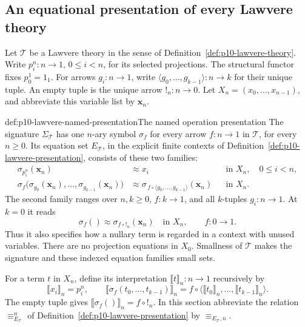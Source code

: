 
\subsection{An equational presentation of every Lawvere theory}
\label{sec:p10-lawvere-presentations}

Let \(\mathcal T\) be a Lawvere theory in the sense of
Definition~\ref{def:p10-lawvere-theory}.
Write \(p_i^n:n\to1\), \(0\leq i<n\), for its selected projections.
The structural functor fixes \(p_0^1=1_1\).
For arrows \(g_i:n\to1\), write
\(\langle g_0,\ldots,g_{k-1}\rangle:n\to k\) for their unique
tuple.  An empty tuple is the unique arrow \(!_n:n\to0\).
Let \(X_n=(x_0,\ldots,x_{n-1})\), and abbreviate this variable
list by \(\mathbf x_n\).

\begin{hbdefinition}{def:p10-lawvere-named-presentation}{The named operation presentation}
The signature \(\Sigma_{\mathcal T}\) has one \(n\)-ary symbol
\(\sigma_f\) for every arrow \(f:n\to1\) in \(\mathcal T\),
for every \(n\geq0\).
Its equation set \(E_{\mathcal T}\), in the explicit finite contexts
of Definition~\ref{def:p10-lawvere-presentation}, consists of these
two families:
\[
\begin{aligned}
 \sigma_{p_i^n}(\mathbf x_n)&\approx x_i
       &&\text{in }X_n,\quad 0\leq i<n,\\
 \sigma_f\bigl(\sigma_{g_0}(\mathbf x_n),\ldots,
                    \sigma_{g_{k-1}}(\mathbf x_n)\bigr)
   &\approx \sigma_{\,f\circ\langle g_0,\ldots,g_{k-1}\rangle}
                      (\mathbf x_n)
       &&\text{in }X_n.
\end{aligned}
\]
The second family ranges over \(n,k\geq0\), \(f:k\to1\), and
all \(k\)-tuples \(g_i:n\to1\).
At \(k=0\) it reads
\[
                  \sigma_f()\approx\sigma_{f\circ!_n}(\mathbf x_n)
                        \quad\text{in }X_n,\qquad f:0\to1.
\]
Thus it also specifies how a nullary term is regarded in a
context with unused variables.  There are no projection equations
in \(X_0\).
Smallness of \(\mathcal T\) makes the signature and these indexed
equation families small sets.

For a term \(t\) in \(X_n\), define its interpretation
\(\llbracket t\rrbracket_n:n\to1\) recursively by
\[
 \llbracket x_i\rrbracket_n=p_i^n,\qquad
 \llbracket\sigma_f(t_0,\ldots,t_{k-1})\rrbracket_n
       =f\circ\langle\llbracket t_0\rrbracket_n,\ldots,
                              \llbracket t_{k-1}\rrbracket_n\rangle .
\]
The empty tuple gives
\(\llbracket\sigma_f()\rrbracket_n=f\circ!_n\).
In this section abbreviate the relation
\(\equiv_{E_{\mathcal T}}^n\) of
Definition~\ref{def:p10-lawvere-presentation} by
\(\equiv_{E_{\mathcal T},n}\).
\end{hbdefinition}

